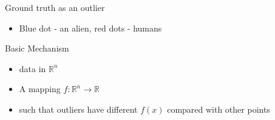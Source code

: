 \documentclass{beamer}
\begin{document}
\begin{darkframes}
\begin{frame}{Ground truth as an outlier}
    \begin{itemize}
        \item Blue dot - an alien, red dots - humans
    \end{itemize}
    \begin{figure}
    \captionsetup[subfigure]{labelformat=empty}
     \centering
	\end{figure}
    
\end{frame}

\begin{frame}{Basic Mechanism}
\begin{itemize}
    \item data in $\mathbb{R}^n$ \vspace{0.5cm}
    \item A mapping $f : \mathbb{R}^n \to \mathbb{R} $  \vspace{0.5cm}
    \item such that outliers have different $f(x)$ compared with other points
\end{itemize}
\end{frame}


\end{darkframes}
\end{document}
